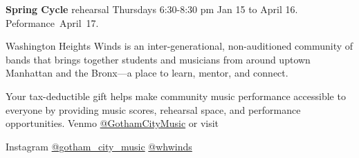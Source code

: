 \documentclass{article}[10pt]
\begin{document}
\begin{center}
\begin{minipage}{115mm}
\begin{center}
                \begin{small}
                    \textbf{Spring Cycle} rehearsal Thursdays 6:30-8:30 pm Jan 15 to April 16.
                    \mbox{Peformance April 17.}
                \end{small}


            \end{center}






            \begin{center}
            {\textbf{}}
            \end{center}
            \vspace{-5mm}

            \begin{center}
            {}
            \end{center}

            \vspace{-3mm}
            \begin{footnotesize}
                Washington Heights Winds is an inter-generational, non-auditioned community of bands that brings together students and musicians from around uptown Manhattan and the Bronx—a place to learn, mentor, and connect.
            \end{footnotesize}



            \begin{center}
            {\textbf{}}
            \end{center}
            \vspace{-3mm}
            \begin{footnotesize}
                Your tax-deductible gift helps make community music performance accessible to everyone by providing music scores, rehearsal space, and performance opportunities.
                Venmo \href{https://account.venmo.com/u/GothamCityMusic}{@GothamCityMusic} or visit \textbf{}
            \end{footnotesize}


            \begin{center}
            {\textbf{}}

                \faInstagram{}{}  Instagram  \href{https://www.instagram.com/gotham_city_music/}{@gotham\_city\_music}
                \href{https://www.instagram.com/whwinds/}{@whwinds}
            \end{center}


        \end{minipage}

    \end{center}
\end{document}
